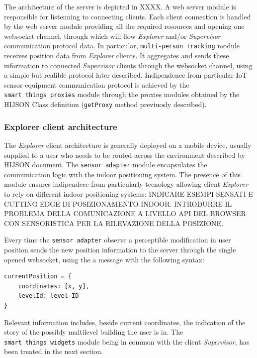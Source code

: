 \documentclass{sig-alternate}
\begin{document}
The architecture of the server is depicted in XXXX. A web server module
is responsible for listenning to connecting clients. Each client
connection is handled by the web server module providing all the
required resources and opening one websocket channel, through which will
flow \emph{Explorer} and/or \emph{Supervisor} communication protocol
data. In particular, \texttt{multi-person\ tracking} module receives
position data from \emph{Explorer} clients. It aggregates and sends
these information to connected \emph{Supervisor} clients through the
websocket channel, using a simple but realible protocol later described.
Indipendence from particular IoT sensor equipment communication protocol
is achieved by the \texttt{smart\ things\ proxies} module through the
proxies modules obtained by the HIJSON Class definition
(\texttt{getProxy} method previuosly described).

\subsubsection{Explorer client architecture}\label{explorer-client-architecture}

The \emph{Explorer} client architecture is generally deployed on a
mobile device, usually supplied to a user who needs to be routed across
the environment described by HIJSON document. The
\texttt{sensor\ adapter} module encapsulates the communication logic
with the indoor positioning system. The presence of this module ensures
indipendece from particularly tecnology allowing client \emph{Explorer}
to rely on different indoor positioning systems: INDICARE ESEMPI SENSATI
E CUTTING EDGE DI POSIZIONAMENTO INDOOR. INTRODURRE IL PROBLEMA DELLA
COMUNICAZIONE A LIVELLO API DEL BROWSER CON SENSORISTICA PER LA
RILEVAZIONE DELLA POSIZIONE.

Every time the \texttt{sensor\ adapter} observe a perceptible
modification in user position sends the new position information to the
server through the single opened websocket, using the a message with the
following syntax:

\begin{verbatim}
currentPosition = {
    coordinates: [x, y],
    levelId: level-ID  
}
\end{verbatim}

Relevant information includes, beside current coordinates, the
indication of the story of the possibly multilevel building the user is
in. The \texttt{smart\ things\ widgets} module being in common with the
client \emph{Supervisor}, has been treated in the next section.
\end{document}
